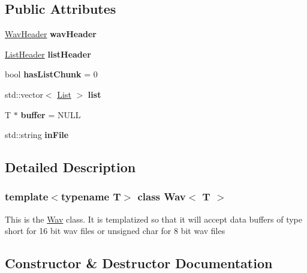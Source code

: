 \subsection*{Public Attributes}
\begin{DoxyCompactItemize}
\item 
\mbox{\label{classWav_afc68f75eb85a46db0a63971974f8d5be}} 
\hyperlink{structWavHeader}{Wav\+Header} {\bfseries wav\+Header}
\item 
\mbox{\label{classWav_a89f07c2c8726afdffb8139842a9af064}} 
\hyperlink{structListHeader}{List\+Header} {\bfseries list\+Header}
\item 
\mbox{\label{classWav_addc4d0d2a45357e8f981e4979c54b91a}} 
bool {\bfseries has\+List\+Chunk} = 0
\item 
\mbox{\label{classWav_a5533801d7288f0f5aad06b032421e9c1}} 
std\+::vector$<$ \hyperlink{structList}{List} $>$ {\bfseries list}
\item 
\mbox{\label{classWav_a329a81309898a70392426f69df63ddaa}} 
T $\ast$ {\bfseries buffer} = N\+U\+LL
\item 
\mbox{\label{classWav_a75e9243abb294e0a69633b3dd8d7adbb}} 
std\+::string {\bfseries in\+File}
\end{DoxyCompactItemize}


\subsection{Detailed Description}
\subsubsection*{template$<$typename T$>$\newline
class Wav$<$ T $>$}

This is the \hyperlink{classWav}{Wav} class. It is templatized so that it will accept data buffers of type short for 16 bit wav files or unsigned char for 8 bit wav files 

\subsection{Constructor \& Destructor Documentation}
\mbox{\label{classWav_a54ee39542f46929187c7a9e032250bdf}} 
